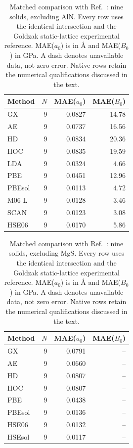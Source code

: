 \begin{table}[t]
\centering
\small
\caption{Matched comparison with Ref.~: nine solids, excluding AlN. Every row uses the identical intersection and the Goldzak static-lattice experimental reference. MAE($a_0$) is in \AA{} and MAE($B_0$) in GPa. A dash denotes unavailable data, not zero error. Native rows retain the numerical qualifications discussed in the text.}
\label{tab:literature-Zhang2018}
\begin{tabular}{lrrr}
\toprule
Method & $N$ & MAE($a_0$) & MAE($B_0$) \\
\midrule
GX & 9 & 0.0827 & 14.78 \\
AE & 9 & 0.0737 & 16.56 \\
HD & 9 & 0.0834 & 20.36 \\
HOC & 9 & 0.0835 & 19.59 \\
LDA & 9 & 0.0324 & 4.66 \\
PBE & 9 & 0.0451 & 12.96 \\
PBEsol & 9 & 0.0113 & 4.72 \\
M06-L & 9 & 0.0128 & 3.46 \\
SCAN & 9 & 0.0123 & 3.08 \\
HSE06 & 9 & 0.0170 & 5.86 \\
\bottomrule
\end{tabular}
\end{table}

\begin{table}[t]
\centering
\small
\caption{Matched comparison with Ref.~: nine solids, excluding MgS. Every row uses the identical intersection and the Goldzak static-lattice experimental reference. MAE($a_0$) is in \AA{} and MAE($B_0$) in GPa. A dash denotes unavailable data, not zero error. Native rows retain the numerical qualifications discussed in the text.}
\label{tab:literature-Schimka2011}
\begin{tabular}{lrrr}
\toprule
Method & $N$ & MAE($a_0$) & MAE($B_0$) \\
\midrule
GX & 9 & 0.0791 & -- \\
AE & 9 & 0.0660 & -- \\
HD & 9 & 0.0807 & -- \\
HOC & 9 & 0.0807 & -- \\
PBE & 9 & 0.0438 & -- \\
PBEsol & 9 & 0.0136 & -- \\
HSE06 & 9 & 0.0132 & -- \\
HSEsol & 9 & 0.0117 & -- \\
\bottomrule
\end{tabular}
\end{table}

